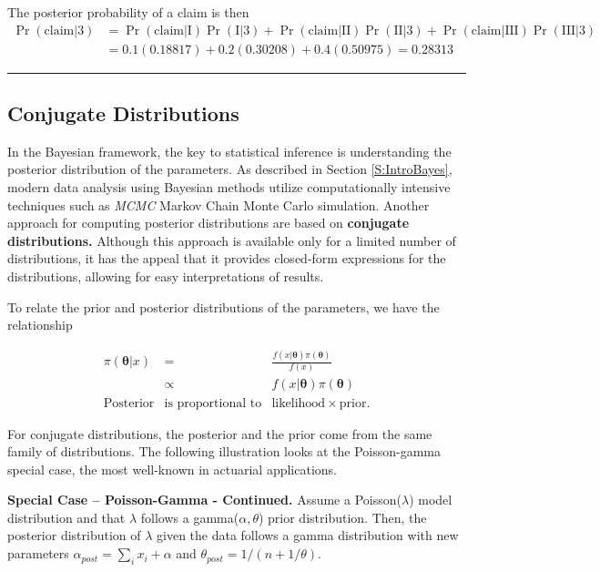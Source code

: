 \documentclass[]{book}
\theoremstyle{definition}
\theoremstyle{definition}
\theoremstyle{definition}
\theoremstyle{remark}
\begin{document}
The posterior probability of a claim is then \[
\begin{aligned} 
\Pr(\text{claim} | 3) &= \Pr(\text{claim}|\text{I})\Pr(\text{I} | 3) + \Pr(\text{claim} | \text{II})\Pr(\text{II} | 3) + \Pr(\text{claim} | \text{III}) \Pr(\text{III} | 3) \\ 
&= 0.1(0.18817) + 0.2(0.30208) + 0.4(0.50975) = 0.28313
\end{aligned}
\]

\begin{center}\rule{0.5\linewidth}{\linethickness}\end{center}

\subsection{Conjugate Distributions}\label{S:ConjugateDistributions}

In the Bayesian framework, the key to statistical inference is
understanding the posterior distribution of the parameters. As described
in Section \ref{S:IntroBayes}, modern data analysis using Bayesian
methods utilize computationally intensive techniques such as
\emph{MCMC}{ Markov Chain Monte Carlo} simulation. Another approach for
computing posterior distributions are based on \textbf{conjugate
distributions.} Although this approach is available only for a limited
number of distributions, it has the appeal that it provides closed-form
expressions for the distributions, allowing for easy interpretations of
results.

To relate the prior and posterior distributions of the parameters, we
have the relationship

\[
\begin{array}{ccc}
\pi(\boldsymbol \theta | x) & = & \frac{f(x|\boldsymbol \theta )\pi(\boldsymbol \theta)}{f(x)}  \\
 & \propto  & f(x|\boldsymbol \theta ) \pi(\boldsymbol \theta) \\
\text{Posterior} & \text{is proportional to} & \text{likelihood} \times \text{prior} .
\end{array}
\]

For conjugate distributions, the posterior and the prior come from the
same family of distributions. The following illustration looks at the
Poisson-gamma special case, the most well-known in actuarial
applications.

\textbf{Special Case -- Poisson-Gamma - Continued.} Assume a
Poisson(\(\lambda\)) model distribution and that \(\lambda\) follows a
gamma(\(\alpha, \theta\)) prior distribution. Then, the posterior
distribution of \(\lambda\) given the data follows a gamma distribution
with new parameters \(\alpha_{post} = \sum_i x_i + \alpha\) and
\(\theta_{post} = 1/(n + 1/\theta)\).
\end{document}
